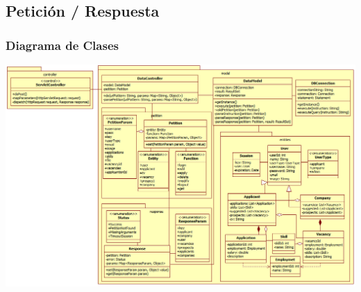 \subsection{Petición / Respuesta}
\frame
{
  \frametitle{Diagrama de Clases}
  \begin{center}
		\includegraphics[scale=0.32]{./resources/ClassDiagram.png}
  \end{center}
}